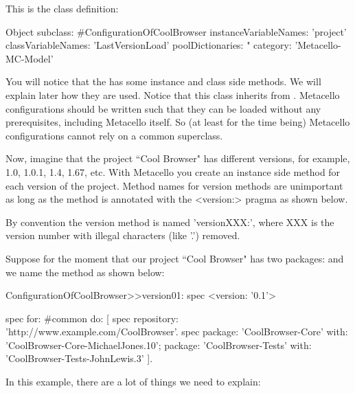 \documentclass[a4paper,10pt,twoside]{book}
\begin{document}
This is the class definition:
\begin{code}{}
Object subclass: #ConfigurationOfCoolBrowser
       instanceVariableNames: 'project'
       classVariableNames: 'LastVersionLoad'
       poolDictionaries: "
       category: 'Metacello-MC-Model'
\end{code}

You will notice that the  has some instance and class side methods. We will explain later how they are used. Notice that this class inherits from .  Metacello configurations should be written such that they can be loaded without any prerequisites, including Metacello itself. So (at least for the time being) Metacello configurations cannot rely on a common superclass.

Now, imagine that the project ``Cool Browser" has different versions, for example, 1.0, 1.0.1, 1.4, 1.67, etc. 
With Metacello you create an instance side method for each version of the project. Method names for version methods are unimportant as long as the method is annotated with the <version:> pragma as shown below.

By convention the version method is named 'versionXXX:', where XXX is the version number with illegal characters (like '.') removed.

Suppose for the moment that our project ``Cool Browser" has two packages:  and  we name the method  as shown below:

\begin{code}{}
ConfigurationOfCoolBrowser>>version01: spec 
       <version: '0.1'>
       
       spec for: #common do: [
              spec repository: 'http://www.example.com/CoolBrowser'.
              spec 
                     package: 'CoolBrowser-Core' with: 'CoolBrowser-Core-MichaelJones.10';
                     package: 'CoolBrowser-Tests' with: 'CoolBrowser-Tests-JohnLewis.3' ].
\end{code}


In this example, there are a lot of things we need to explain:
\end{document}
